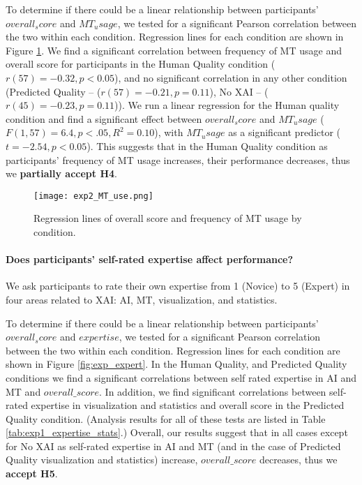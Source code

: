 To determine if there could be a linear relationship between participants' $overall_score$ and $MT_usage$, we tested for a significant Pearson correlation between the two within each condition.
Regression lines for each condition are shown in Figure \ref{fig:exp_MT_use}. We find a significant correlation between frequency of MT usage and overall score for participants in the Human Quality condition ($r(57) = -0.32, p < 0.05$), and no significant correlation in any other condition (Predicted Quality -- ($r(57) = -0.21, p = 0.11$), No XAI -- ($r(45) = -0.23, p = 0.11$)). We run a linear regression for the Human quality condition and find a significant effect between $overall_score$ and $MT_usage$ ($F(1, 57) = 6.4, p < .05, R^2 = 0.10$), with $MT_usage$ as a significant predictor ($t = -2.54, p < 0.05$). This suggests that in the Human Quality condition as participants’ frequency of MT usage increases, their performance decreases, thus we \textbf{partially accept H4}.

\begin{figure}[h!]
    \centering
    \texttt{[image: exp2\_MT\_use.png]}
    \caption{Regression lines of overall score and frequency of MT usage by condition.}
    \label{fig:exp_MT_use}
\end{figure}

\paragraph{\textbf{Does participants' self-rated expertise affect performance?}}

We ask participants to rate their own expertise from 1 (Novice) to 5 (Expert) in four areas related to XAI: AI, MT, visualization, and statistics. 

To determine if there could be a linear relationship between participants' $overall_score$ and $expertise$, we tested for a significant Pearson correlation between the two within each condition. Regression lines for each condition are shown in Figure \ref{fig:exp_expert}.
In the Human Quality, and Predicted Quality conditions we find a significant correlations between self rated expertise in AI and MT and $overall\_score$. In addition, we find significant correlations between self-rated expertise in visualization and statistics and overall score in the Predicted Quality condition.  
(Analysis results for all of these tests are listed in Table \ref{tab:exp1_expertise_stats}.) Overall, our results suggest that in all cases except for No XAI as self-rated expertise in AI and MT (and in the case of Predicted Quality visualization and statistics) increase, $overall\_score$ decreases, thus we \textbf{accept H5}.

